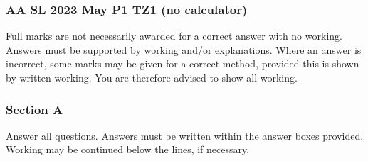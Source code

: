 \documentclass[12pt, twoside]{article}
\begin{document}
\subsubsection*{AA SL 2023 May P1 TZ1 (no calculator)}

Full marks are not necessarily awarded for a correct answer with no working. Answers must be supported by working and/or explanations. Where an answer is incorrect, some marks may be given for a correct method, provided this is shown by written working. You are therefore advised to show all working.

\subsubsection*{Section A}
Answer all questions. Answers must be written within the answer boxes provided. Working may be continued below the lines, if necessary.
\end{document}
